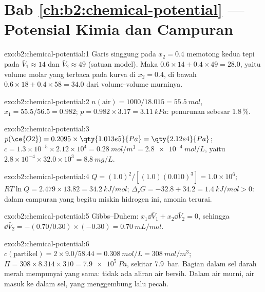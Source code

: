 \section*{Bab \ref{ch:b2:chemical-potential} --- Potensial Kimia dan Campuran}

\begin{solution}{exo:b2:chemical-potential:1}
Garis singgung pada $x_2 = 0.4$ memotong kedua tepi pada $\bar V_1 \approx 14$
dan $\bar
V_2 \approx 49$ (satuan model). Maka $0.6 \times 14 + 0.4 \times 49 = 28.0$, yaitu volume molar yang terbaca pada kurva di $x_2 = 0.4$, di bawah
$0.6 \times 18 + 0.4 \times 58 = 34.0$ dari volume-volume murninya.
\end{solution}

\begin{solution}{exo:b2:chemical-potential:2}
$n(\text{air}) = 1000/18.015 = \qty{55.5}{mol}$, $x_1 = 55.5/56.5 = 0.982$;
$p = 0.982 \times 3.17 = \qty{3.11}{kPa}$: penurunan sebesar 1.8\,\%.
\end{solution}

\begin{solution}{exo:b2:chemical-potential:3}
$p(\ce{O2}) = 0.2095 \times \qty{1.013e5}{Pa} = \qty{2.12e4}{Pa}$;
$c = 1.3 \times 10^{-5} \times 2.12 \times 10^4 = \qty{0.28}{mol/m^3} =
\qty{2.8e-4}{mol/L}$, yaitu $2.8 \times 10^{-4} \times 32.0 \times 10^3 =
\qty{8.8}{mg/L}$.
\end{solution}

\begin{solution}{exo:b2:chemical-potential:4}
$Q = (1.0)^2/[(1.0)(0.010)^3] = 1.0 \times 10^6$; $RT\ln Q = 2.479 \times 13.82 =
\qty{34.2}{kJ/mol}$; $\Delta_r G = -32.8 + 34.2 = \qty{+1.4}{kJ/mol} > 0$:
dalam campuran yang begitu miskin hidrogen ini, amonia terurai.
\end{solution}

\begin{solution}{exo:b2:chemical-potential:5}
Gibbs--Duhem: $x_1\dd\bar V_1 + x_2\dd\bar V_2 = 0$, sehingga $\dd\bar V_2 =
-(0.70/0.30) \times (-0.30) = \qty{+0.70}{mL/mol}$.
\end{solution}

\begin{solution}{exo:b2:chemical-potential:6}
$c(\text{partikel}) = 2 \times 9.0/58.44 = \qty{0.308}{mol/L} =
\qty{308}{mol/m^3}$; $\Pi = 308 \times 8.314 \times 310 = \qty{7.9e5}{Pa}$,
sekitar \qty{7.9}{bar}. Bagian dalam sel darah merah mempunyai  yang sama: tidak ada aliran air bersih. Dalam air murni, air masuk
ke dalam sel, yang menggembung lalu pecah.
\end{solution}

